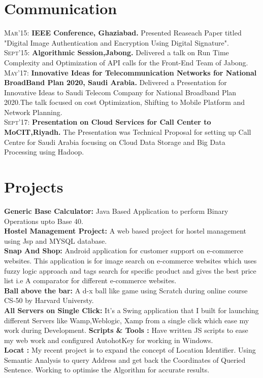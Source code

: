 \documentclass[a4paper,10pt]{article}
\begin{document}
\section{Communication}
\textsc{Mar'15: }\textbf{IEEE Conference, Ghaziabad.} \normalsize 
Presented Reaseach Paper titled "Digital Image Authentication and Encryption Using Digital Signature". \\
\textsc{Sept'15: }\textbf{Algorithmic Session,Jabong.} \normalsize
Delivered a talk on Run Time Complexity and Optimization of API calls for the Front-End Team of Jabong. \\
\textsc{May'17: }\textbf{Innovative Ideas for Telecommunication Networks for National BroadBand Plan 2020, Saudi Arabia.} Delivered a Presentation for Innovative Ideas to Saudi Telecom Company for National Broadband Plan 2020.The talk focused on cost Optimization, Shifting to Mobile Platform and Network Planning. \\
\textsc{Sept'17: }\textbf{Presentation on Cloud Services for Call Center to MoCIT,Riyadh.} The Presentation was Technical Proposal for setting up Call Centre for Saudi Arabia focusing on Cloud Data Storage and Big Data Processing using Hadoop.\\
\normalsize

\section{Projects}
\textbf{Generic Base Calculator:} \normalsize Java Based Application to perform Binary Operations upto Base 40. \\
\textbf{Hostel Management Project:} \normalsize A web based project for hostel management using Jsp and MYSQL database. \\
\textbf{Snap And Shop:} \normalsize Android application for customer support on e-commerce websites. This application is for image search on e-commerce websites which uses fuzzy logic approach and tags search for specific product and gives the best price list i.e A comparator for different e-commerce websites. \\
\textbf{Ball above the bar:} \normalsize A d-x ball like game using Scratch during online course CS-50 by Harvard Universty.\\
\textbf{All Servers on Single Click:} \normalsize It’s a Swing application that I built for launching different Servers like Wamp,Weblogic, Xamp from a single click which ease my work during Development.
\textbf{Scripts \& Tools :} \normalsize Have written JS scripts to ease my web work and configured AutohotKey for working in Windows.\\
\textbf{Locat :} \normalsize My recent project is to expand the concept of Location Identifier. Using Semantic Analysis to query Address and get back the Coordinates of Queried Sentence. Working to optimise the Algorithm for accurate results. 
\end{document}
